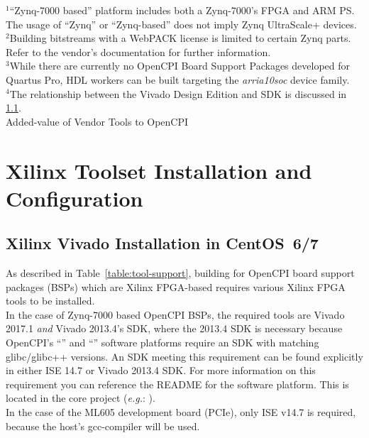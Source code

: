 \begin{flushleft}
\begin{landscape}
\begin{center}
\begin{table}[H]
		\footnotesize{$^1$``Zynq-7000 based'' platform includes both a Zynq-7000's FPGA and ARM PS. The usage of ``Zynq'' or ``Zynq-based'' does not imply Zynq UltraScale+ devices.}\\
		\footnotesize{$^2$Building bitstreams with a WebPACK license is limited to certain Zynq parts. Refer to the vendor's documentation for further information.}\\
		\footnotesize{$^3$While there are currently no OpenCPI Board Support Packages developed for Quartus Pro, HDL workers can be built targeting the \textit{arria10soc} device family.}\\
		\footnotesize{$^4$The relationship between the Vivado Design Edition and SDK is discussed in \ref{sec:viv_intro}.}\\
		\caption {Added-value of Vendor Tools to OpenCPI}
		\label{table:tool-support} %
	\end{table}
\end{center}
\end{landscape}

\section{Xilinx Toolset Installation and Configuration}
\subsection{Xilinx Vivado Installation in CentOS~6/7}
\label{sec:viv_intro}
\begin{flushleft}
As described in Table~\ref{table:tool-support}, building for OpenCPI board support packages (BSPs) which are Xilinx FPGA-based requires various Xilinx FPGA tools to be installed. \\ \medskip
In the case of Zynq-7000 based OpenCPI BSPs, the required tools are Vivado 2017.1 \textit{and} Vivado 2013.4's SDK, where the 2013.4 SDK is necessary because OpenCPI's ``'' and ``'' software platforms require an SDK with matching glibc/glibc++ versions. An SDK meeting this requirement can be found explicitly in either ISE 14.7 or Vivado 2013.4 SDK. For more information on this requirement you can reference the README for the  software platform. This is located in the core project (\textit{e.g.}: ).\\ \medskip
In the case of the ML605 development board (PCIe), only ISE v14.7 is required, because the host's gcc-compiler will be used.


\end{flushleft}
\end{flushleft}
